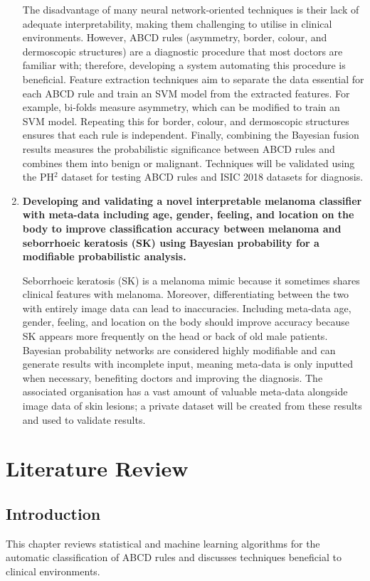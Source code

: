 \documentclass[10.5pt]{report}
\begin{document}
\begin{enumerate}
The disadvantage of many neural network-oriented techniques is their lack of adequate interpretability, making them challenging to utilise in clinical environments. However, ABCD rules (asymmetry, border, colour, and dermoscopic structures) are a diagnostic procedure that most doctors are familiar with; therefore, developing a system automating this procedure is beneficial. Feature extraction techniques aim to separate the data essential for each ABCD rule and train an SVM model from the extracted features. For example, bi-folds measure asymmetry, which can be modified to train an SVM model. Repeating this for border, colour, and dermoscopic structures ensures that each rule is independent. Finally, combining the Bayesian fusion results measures the probabilistic significance between ABCD rules and combines them into benign or malignant. Techniques will be validated using the PH$^2$ dataset for testing ABCD rules and ISIC 2018 datasets for diagnosis.

\item \textbf{Developing and validating a novel interpretable melanoma classifier with meta-data including age, gender, feeling, and location on the body to improve classification accuracy between melanoma and seborrhoeic keratosis (SK) using Bayesian probability for a modifiable probabilistic analysis.}

Seborrhoeic keratosis (SK) is a melanoma mimic because it sometimes shares clinical features with melanoma. Moreover, differentiating between the two with entirely image data can lead to inaccuracies. Including meta-data age, gender, feeling, and location on the body should improve accuracy because SK appears more frequently on the head or back of old male patients. Bayesian probability networks are considered highly modifiable and can generate results with incomplete input, meaning meta-data is only inputted when necessary, benefiting doctors and improving the diagnosis. The associated organisation has a vast amount of valuable meta-data alongside image data of skin lesions; a private dataset will be created from these results and used to validate results.


\end{enumerate}

\chapter{Literature Review}

\section{Introduction}
This chapter reviews statistical and machine learning algorithms for the automatic classification of ABCD rules and discusses techniques beneficial to clinical environments.
\end{document}

